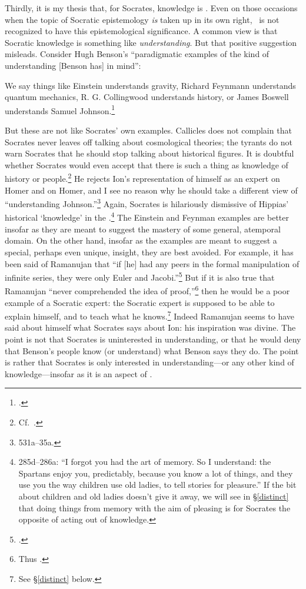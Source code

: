 \documentclass[11pt,letterpaper,oneside]{amsart} %
\begin{document}

Thirdly, it is my thesis that, for Socrates, knowledge is \techne. Even on those occasions when the topic of Socratic epistemology \emph{is} taken up in its own right, \techne\ is not recognized to have this epistemological significance. A common view is that Socratic knowledge is something like \emph{understanding}. But that positive suggestion misleads. Consider Hugh Benson's ``paradigmatic examples of the kind of understanding [Benson has] in mind'':\begin{squote}We say things like Einstein understands gravity, Richard Feynmann understands quantum mechanics, R. G. Collingwood understands history, or James Boswell understands Samuel Johnson.\footnote{\citet[pp.\ 211--212]{benson2000swm}.}\end{squote}But these are not like Socrates' own examples. Callicles does not complain that Socrates never leaves off talking about cosmological theories; the tyrants do not warn Socrates that he should stop talking about historical figures. It is doubtful whether Socrates would even accept that there is such a thing as knowledge of history or people.\footnote{Cf.\ \citet[p.\ 326]{allen1989dpe}.} He rejects Ion's representation of himself as an expert on Homer and  on Homer, and I see no reason why he should take a different view of ``understanding Johnson.''\footnote{ 531a--35a.} Again, Socrates is hilariously dismissive of Hippias' historical `knowledge' in the .\footnote{285d--286a: ``I forgot you had the art of memory. So I understand: the Spartans enjoy you, predictably, because you know a lot of things, and they use you the way children use old ladies, to tell stories for pleasure.'' If the bit about children and old ladies doesn't give it away, we will see in \S\ref{distinct} that doing things from memory with the aim of pleasing is for Socrates the opposite of acting out of knowledge.} The Einstein and Feynman examples are better insofar as they are meant to suggest the mastery of some general, atemporal domain. On the other hand, insofar as the examples are meant to suggest a special, perhaps even unique, insight, they are best avoided. For example, it has been said of Ramanujan that ``if [he] had any peers in the formal manipulation of infinite series, they were only Euler and Jacobi.''\footnote{\citet[p.\ 6]{berndt1985ramanujan}.} But if it is also true that Ramanujan ``never comprehended the idea of proof,''\footnote{Thus \citet{chaitin2007less}.} then he would be a poor example of a Socratic expert: the Socratic expert is supposed to be able to explain himself, and to teach what he knows.\footnote{See \S\ref{distinct} below.} Indeed Ramanujan seems to have said about himself what Socrates says about Ion: his inspiration was divine. The point is not that Socrates is uninterested in understanding, or that he would deny that Benson's people know (or understand) what Benson says they do. The point is rather that Socrates is only interested in understanding---or any other kind of knowledge---insofar as it is an aspect of \techne.
\end{document}
